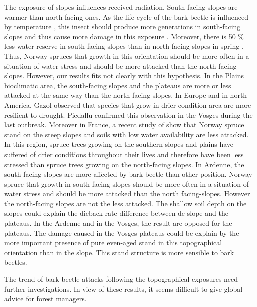 \documentclass[3p,procedia]{elsarticle}
\begin{document}
The exposure of slopes influences received radiation.
South facing slopes are warmer than north facing ones.
As the life cycle of the bark beetle is influenced by temperature \citep{baier_phenipscomprehensive_2007},
this insect should produce more generations in south-facing slopes and thus cause  more damage in this exposure \citep{jakus_1995}.
Moreover, there is 50 \% less water reserve in south-facing slopes than in north-facing slopes in spring \citep{Rouse_1969}.
Thus, Norway spruces that growth in this orientation should be more often in a situation of water stress and should be more attacked than the north-facing slopes.
However, our results fits not clearly with this hypothesis. In the Plains bioclimatic area, the south-facing slopes and the plateaus are more or less attacked at the same way than the north-facing slopes. In Europe and in north America, Gazol \citep{gazol_2017} observed that species that grow in drier condition area are more resilient to drought.
Piedallu \citep{piedallu_spatial_2022} confirmed this observation in the Vosges during the last outbreak.
Moreover in France, a recent study of \cite{nardi_drought_2022} show that Norway spruce stand on the steep slopes and soils with low water availability are less attacked.
In this region, spruce trees growing on the southern slopes and plains have suffered of drier conditions throughout their lives and therefore have been less stressed than spruce trees growing on the north-facing slopes.
In Ardenne, the south-facing slopes are more affected by bark beetle than other position.
Norway spruce that growth in south-facing slopes should be more often in a situation of water stress and should be more attacked than the north facing-slopes.
However the north-facing slopes are not the less attacked. 
The shallow soil depth on the slopes could explain the dieback rate difference between de slope and the plateaus. 
In the Ardenne and in the Vosges, the result are opposed for the plateaus.
The damage caused in the Vosges plateaus could be explain by the more important presence of pure even-aged stand in this topographical orientation than in the slope.
This stand structure is more sensible to bark beetles.

The trend of bark beetle attacks following the topographical exposures need further investigations.
In view of these results, it seems difficult to give global advice for forest managers.
\end{document}

